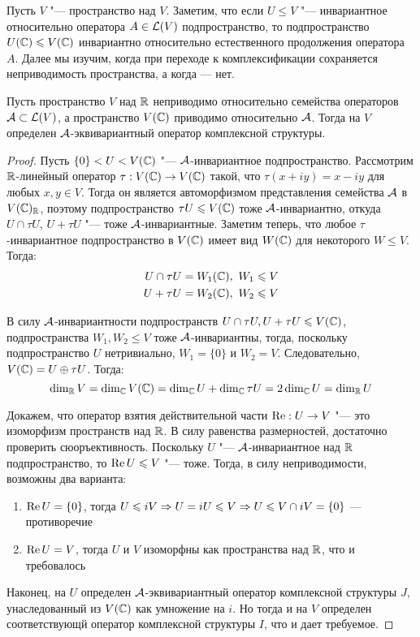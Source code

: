 \begin{note}
	Пусть $V$ "--- пространство над $V$. Заметим, что если $U \le V$ "--- инвариантное относительно оператора $A \in \mathcal L(V)$ подпространство, то подпространство $U(\mathbb{C}) \leqslant V(\mathbb{C})$ инвариантно относительно естественного продолжения оператора $A$. Далее мы изучим, когда при переходе к комплексификации сохраняется неприводимость пространства, а когда --- нет.
\end{note}

\begin{theorem}
	Пусть пространство $V$ над $\mathbb{R}$ неприводимо относительно семейства операторов $\mathcal A \subset \mathcal L(V)$, а пространство $V(\mathbb{C})$ приводимо относительно $\mathcal A$. Тогда на $V$ определен $\mathcal A$-эквивариантный оператор комплексной структуры.
\end{theorem}

\begin{proof}
	Пусть $\{0\} < U < V(\mathbb{C})$ "--- $\mathcal A$-инвариантное подпространство. Рассмотрим $\mathbb{R}$-линейный оператор $\tau : V(\mathbb{C}) \to V(\mathbb{C})$ такой, что $\tau (x + iy) = x - iy$ для любых $x, y \in V$. Тогда он является автоморфизмом представления семейства $\mathcal A$ в $V(\mathbb{C})_{\mathbb{R}}$, поэтому подпространство $\tau U \leqslant V(\mathbb{C})$ тоже $\mathcal A$-инвариантно, откуда $U \cap \tau U$, $U + \tau U$ "--- тоже $\mathcal A$-инвариантные. Заметим теперь, что любое $\tau$-инвариантное подпространство в $V(\mathbb{C})$ имеет вид $W(\mathbb{C})$ для некоторого $W \le V$. Тогда:
	\begin{align*}
		U \cap \tau U &= W_1(\mathbb{C}),~W_1 \leqslant V\\
		U + \tau U &= W_2(\mathbb{C}),~W_2 \leqslant V
	\end{align*}
	
	В силу $\mathcal A$-инвариантности подпространств $U \cap \tau U, U + \tau U \leqslant V(\mathbb{C})$, подпространства $W_1, W_2 \le V$ тоже $\mathcal A$-инвариантны, тогда, поскольку подпространство $U$ нетривиально, $W_1 = \{0\}$ и $W_2 = V$. Следовательно, $V(\mathbb{C}) = U \oplus \tau U$. Тогда:
	\[\dim_{\mathbb{R}} V = \dim_{\mathbb{C}} V(\mathbb{C}) = \dim_{\mathbb{C}} U + \dim_{\mathbb{C}} \tau U = 2\dim_{\mathbb{C}} U = \dim_{\mathbb{R}} U\]
	
	Докажем, что оператор взятия действительной части $\operatorname{Re} : U \to V$ "--- это изоморфизм пространств над $\mathbb{R}$. В силу равенства размерностей, достаточно проверить сюоръективность. Поскольку $U$ "--- $\mathcal A$-инвариантное над $\mathbb{R}$ подпространство, то $\operatorname{Re} U \leqslant V$ "--- тоже. Тогда, в силу неприводимости, возможны два варианта:
	\begin{enumerate}
		\item $\operatorname{Re} U= \{0\}$, тогда $U \leqslant iV \Rightarrow U = iU \leqslant V \Rightarrow U \leqslant V \cap iV = \{0\}$ --- противоречие
		\item $\operatorname{Re} U = V$, тогда $U$ и $V$ изоморфны как пространства над $\mathbb{R}$, что и требовалось
	\end{enumerate} 
		
	Наконец, на $U$ определен $\mathcal A$-эквивариантный оператор комплексной структуры $J$, унаследованный из $V(\mathbb{C})$ как умножение на $i$. Но тогда и на $V$ определен соответствующй оператор комплексной структуры $I$, что и дает требуемое.
\end{proof}

